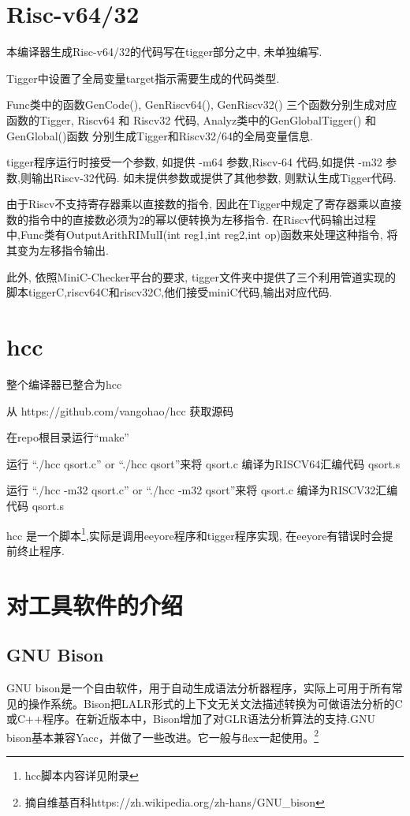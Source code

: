 \documentclass[UTF8]{article}
\begin{document}
\section{Risc-v64/32}
本编译器生成Risc-v64/32的代码写在tigger部分之中, 未单独编写.

Tigger中设置了全局变量target指示需要生成的代码类型.

Func类中的函数GenCode(), GenRiscv64(), GenRiscv32() 三个函数分别生成对应函数的Tigger, Riscv64 和 Riscv32 代码, Analyz类中的GenGlobalTigger() 和GenGlobal()函数 分别生成Tigger和Riscv32/64的全局变量信息.

tigger程序运行时接受一个参数, 如提供 -m64 参数,Riscv-64 代码,如提供 -m32 参数,则输出Riscv-32代码. 如未提供参数或提供了其他参数, 则默认生成Tigger代码.

由于Riscv不支持寄存器乘以直接数的指令, 因此在Tigger中规定了寄存器乘以直接数的指令中的直接数必须为2的幂以便转换为左移指令. 在Riscv代码输出过程中,Func类有OutputArithRIMulI(int reg1,int reg2,int op)函数来处理这种指令, 将其变为左移指令输出.

此外, 依照MiniC-Checker平台的要求, tigger文件夹中提供了三个利用管道实现的脚本tiggerC,riscv64C和riscv32C,他们接受miniC代码,输出对应代码.
\section{hcc}
整个编译器已整合为hcc

从 https://github.com/vangohao/hcc 获取源码

在repo根目录运行``make''

运行 ``./hcc qsort.c'' or ``./hcc qsort''来将 qsort.c 编译为RISCV64汇编代码 qsort.s

运行 ``./hcc -m32 qsort.c'' or ``./hcc -m32 qsort''来将 qsort.c 编译为RISCV32汇编代码 qsort.s

hcc 是一个脚本\footnote{hcc脚本内容详见附录},实际是调用eeyore程序和tigger程序实现, 在eeyore有错误时会提前终止程序.
\section{对工具软件的介绍}
\subsection{GNU Bison}
GNU bison是一个自由软件，用于自动生成语法分析器程序，实际上可用于所有常见的操作系统。Bison把LALR形式的上下文无关文法描述转换为可做语法分析的C或C++程序。在新近版本中，Bison增加了对GLR语法分析算法的支持.GNU bison基本兼容Yacc，并做了一些改进。它一般与flex一起使用。\footnote{摘自维基百科https://zh.wikipedia.org/zh-hans/GNU\_bison} 
\end{document}

